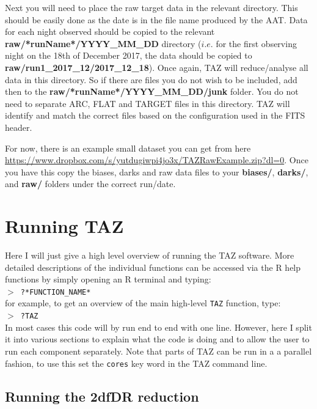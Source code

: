 \documentclass[12pt]{article}
\begin{document}
Next you will need to place the raw target data in the relevant directory. This should be easily done as the date is in the file name produced by the AAT. Data for each night observed should be copied to the relevant \textbf{raw/*runName*/YYYY\_MM\_DD} directory ($i.e.$ for the first observing night on the 18th of December 2017, the data should be copied to \textbf{raw/run1\_2017\_12/2017\_12\_18}). Once again, TAZ will reduce/analyse all data in this directory. So if there are files you do not wish to be included, add then to the \textbf{raw/*runName*/YYYY\_MM\_DD/junk} folder. You do not need to separate ARC, FLAT and TARGET files in this directory. TAZ will identify and match the correct files based on the configuration used in the FITS header.  

For now, there is an example small dataset you can get from here \url{https://www.dropbox.com/s/yutdugiwpi4jo3x/TAZRawExample.zip?dl=0}. Once you have this copy the biases, darks and raw data files to your \textbf{biases/}, \textbf{darks/}, and \textbf{raw/} folders under the correct run/date.  

\section{Running TAZ}

Here I will just give a high level overview of running the TAZ software. More detailed descriptions of the individual functions can be accessed via the R help functions by simply opening an R terminal and typing: \\

\hspace{10mm}  \texttt{$>$ ?*FUNCTION\_NAME*}\\

for example, to get an overview of the main high-level \texttt{TAZ} function, type:\\

\hspace{10mm}  \texttt{$>$ ?TAZ}\\

In most cases this code will by run end to end with one line. However, here I split it into various sections to explain what the code is doing and to allow the user to run each component separately. Note that parts of TAZ can be run in a a parallel fashion, to use this set the \texttt{cores} key word in the TAZ command line.

\subsection{Running the 2dfDR reduction}
\end{document}
